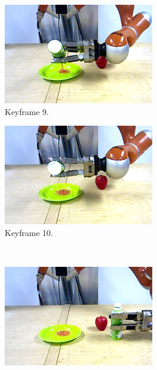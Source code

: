 \begin{figure}
\begin{subfigure}[t]{0.475\textwidth}
    \includegraphics[width=\textwidth]{./figures/sec/planning/exec3/frame2799.jpg}
    \caption{Keyframe 9.}
    \label{fig:sec_usingaffordanceforplanning_results_scenario3_9}
  \end{subfigure}
  \hfill
  \begin{subfigure}[t]{0.475\textwidth}
    \includegraphics[width=\textwidth]{./figures/sec/planning/exec3/frame2912.jpg}
    \caption{Keyframe 10.}
    \label{fig:sec_usingaffordanceforplanning_results_scenario3_10}
  \end{subfigure}\\%
  \begin{subfigure}[t]{0.475\textwidth}
    \includegraphics[width=\textwidth]{./figures/sec/planning/exec3/frame3219.jpg}

\end{subfigure}
\end{figure}
